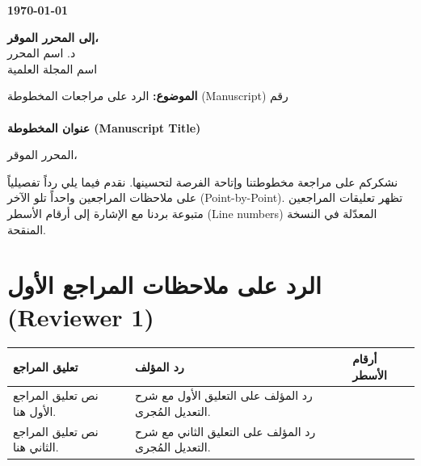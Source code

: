 \documentclass[11pt,a4paper]{article}
\begin{document}
\thispagestyle{fancy}

\begin{flushleft}
\textbf{\today}
\end{flushleft}

\vspace{1em}

\noindent
\textbf{إلى المحرر الموقر،}\\[0.5em]
د. اسم المحرر\\
اسم المجلة العلمية

\vspace{1em}

\noindent
\textbf{الموضوع:} الرد على مراجعات المخطوطة (Manuscript) رقم \\
\textbf{}\\
\textbf{عنوان المخطوطة (Manuscript Title)}

\vspace{1em}

\noindent
المحرر الموقر،

\vspace{0.5em}

نشكركم على مراجعة مخطوطتنا وإتاحة الفرصة لتحسينها. نقدم فيما يلي رداً تفصيلياً على ملاحظات المراجعين واحداً تلو الآخر (Point-by-Point). تظهر تعليقات المراجعين متبوعة بردنا مع الإشارة إلى أرقام الأسطر (Line numbers) المعدّلة في النسخة المنقحة.

\vspace{1em}

\section{الرد على ملاحظات المراجع الأول (Reviewer 1)}


\begin{table}[H]
\centering
\small
\begin{tabularx}{\textwidth}{L{5cm} Y L{2.5cm}}
\toprule
\textbf{تعليق المراجع} & \textbf{رد المؤلف} & \textbf{أرقام الأسطر} \\
\midrule
 نص تعليق المراجع الأول هنا.
& %
رد المؤلف على التعليق الأول مع شرح التعديل المُجرى.
&  \\
\midrule
 نص تعليق المراجع الثاني هنا.
& %
رد المؤلف على التعليق الثاني مع شرح التعديل المُجرى.
&  \\
\bottomrule
\end{tabularx}
\end{table}
\end{document}
